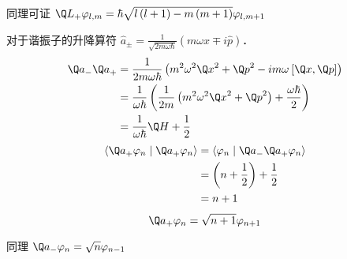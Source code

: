 同理可证 ${\Q L_ + }{\varphi_{l,m}} = \hbar \sqrt {l\left( {l + 1} \right) - m\left( {m + 1} \right)} {\varphi_{l,m + 1}}$ 


对于谐振子的升降算符 ${\hat a_ \pm } = \frac{1}{{\sqrt {2m\omega \hbar } }}\left( {m\omega \hat x \mp i\hat p} \right)$．   
 \begin{equation}
  \begin{aligned}
  {{\Q a}_ - }{{\Q a}_ + } &= \frac{1}{2m\omega \hbar }\left( {{m^2}{\omega ^2}{{\Q x}^2} + {{\Q p}^2} - im\omega {\kern 1pt} {\kern 1pt} [\Q x,\Q p]} \right) \hfill \\
   &= \frac{1}{\omega \hbar }\left( {\frac{1}{2m}\left( {{m^2}{\omega ^2}{{\Q x}^2} + {{\Q p}^2}} \right) + \frac{\omega \hbar }{2}} \right) \hfill \\
  & = \frac{1}{\omega \hbar }\Q H + \frac{1}{2} \hfill \\ 
\end{aligned} 
\end{equation}
 \begin{equation}
  \begin{aligned}
  \left\langle {{{\Q a}_ + }{\varphi_n}}
 \mathrel{\left | {\vphantom {{{{\Q a}_ + }{\varphi_n}} {{{\Q a}_ + }{\varphi_n}}}}
 \right. \kern-\nulldelimiterspace}
 {{{\Q a}_ + }{\varphi_n}} \right\rangle  &= \left\langle {\varphi_n}
 \mathrel{\left | {\vphantom {{\varphi_n} {{{\Q a}_ - }{{\Q a}_ + }{\varphi_n}}}}
 \right. \kern-\nulldelimiterspace}
 {{{\Q a}_ - }{{\Q a}_ + }{\varphi_n}} \right\rangle  \hfill \\
  & = \left( {n + \frac{1}{2}} \right) + \frac{1}{2} \\
  &= n + 1 \hfill \\ 
\end{aligned} 
\end{equation}
\begin{equation}
  {\Q a_ + }{\varphi_n} = \sqrt {n + 1} {\varphi_{n + 1}}
\end{equation}
 
同理 ${\Q a_ - }{\varphi_n} = \sqrt n {\varphi_{n - 1}}$   

